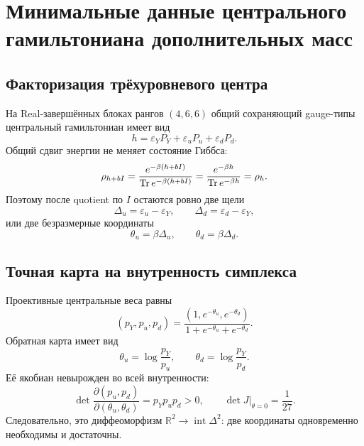 \chapter{Минимальные данные центрального гамильтониана дополнительных масс}
\label{ch:v8-extra-edge-mass-minimal-central-hamiltonian-data}

\section{Факторизация трёхуровневого центра}

На Real-завершённых блоках рангов $(4,6,6)$ общий сохраняющий gauge-типы
центральный гамильтониан имеет вид
\begin{equation}
 h=\varepsilon_YP_Y+\varepsilon_uP_u+\varepsilon_dP_d.
 \label{eq:v8-extra-mass-minimal-hamiltonian}
\end{equation}
Общий сдвиг энергии не меняет состояние Гиббса:
\begin{equation}
 \rho_{h+bI}=\frac{e^{-\beta(h+bI)}}{\operatorname{Tr} e^{-\beta(h+bI)}}
 =\frac{e^{-\beta h}}{\operatorname{Tr} e^{-\beta h}}=\rho_h.
 \label{eq:v8-extra-mass-hamiltonian-shift}
\end{equation}
Поэтому после quotient по $I$ остаются ровно две щели
\begin{equation}
 \Delta_u=\varepsilon_u-\varepsilon_Y,
 \qquad
 \Delta_d=\varepsilon_d-\varepsilon_Y,
 \label{eq:v8-extra-mass-two-gaps}
\end{equation}
или две безразмерные координаты
\begin{equation}
 \theta_u=\beta\Delta_u,
 \qquad
 \theta_d=\beta\Delta_d.
 \label{eq:v8-extra-mass-two-dimensionless-gaps}
\end{equation}

\section{Точная карта на внутренность симплекса}

Проективные центральные веса равны
\begin{equation}
 (p_Y,p_u,p_d)=\frac{(1,e^{-\theta_u},e^{-\theta_d})}
 {1+e^{-\theta_u}+e^{-\theta_d}}.
 \label{eq:v8-extra-mass-softmax-map}
\end{equation}
Обратная карта имеет вид
\begin{equation}
 \theta_u=\log\frac{p_Y}{p_u},
 \qquad
 \theta_d=\log\frac{p_Y}{p_d}.
 \label{eq:v8-extra-mass-softmax-inverse}
\end{equation}
Её якобиан невырожден во всей внутренности:
\begin{equation}
 \det\frac{\partial(p_u,p_d)}{\partial(\theta_u,\theta_d)}
 =p_Yp_up_d>0,
 \qquad
 \det J\big|_{\theta=0}=\frac1{27}.
 \label{eq:v8-extra-mass-softmax-jacobian}
\end{equation}
Следовательно, это диффеоморфизм $\mathbb R^2\to\operatorname{int}\Delta^2$:
две координаты одновременно необходимы и достаточны.

